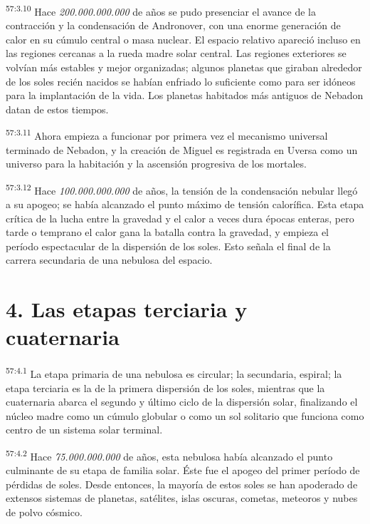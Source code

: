 \par
\textsuperscript{57:3.10} Hace \textit{200.000.000.000} de años se pudo presenciar el avance de la contracción y la condensación de Andronover, con una enorme generación de calor en su cúmulo central o masa nuclear. El espacio relativo apareció incluso en las regiones cercanas a la rueda madre solar central. Las regiones exteriores se volvían más estables y mejor organizadas; algunos planetas que giraban alrededor de los soles recién nacidos se habían enfriado lo suficiente como para ser idóneos para la implantación de la vida. Los planetas habitados más antiguos de Nebadon datan de estos tiempos.

\par
\textsuperscript{57:3.11} Ahora empieza a funcionar por primera vez el mecanismo universal terminado de Nebadon, y la creación de Miguel es registrada en Uversa como un universo para la habitación y la ascensión progresiva de los mortales.

\par
\textsuperscript{57:3.12} Hace \textit{100.000.000.000} de años, la tensión de la condensación nebular llegó a su apogeo; se había alcanzado el punto máximo de tensión calorífica. Esta etapa crítica de la lucha entre la gravedad y el calor a veces dura épocas enteras, pero tarde o temprano el calor gana la batalla contra la gravedad, y empieza el período espectacular de la dispersión de los soles. Esto señala el final de la carrera secundaria de una nebulosa del espacio.

\section*{4. Las etapas terciaria y cuaternaria}
\par
\textsuperscript{57:4.1} La etapa primaria de una nebulosa es circular; la secundaria, espiral; la etapa terciaria es la de la primera dispersión de los soles, mientras que la cuaternaria abarca el segundo y último ciclo de la dispersión solar, finalizando el núcleo madre como un cúmulo globular o como un sol solitario que funciona como centro de un sistema solar terminal.

\par
\textsuperscript{57:4.2} Hace \textit{75.000.000.000} de años, esta nebulosa había alcanzado el punto culminante de su etapa de familia solar. Éste fue el apogeo del primer período de pérdidas de soles. Desde entonces, la mayoría de estos soles se han apoderado de extensos sistemas de planetas, satélites, islas oscuras, cometas, meteoros y nubes de polvo cósmico.

